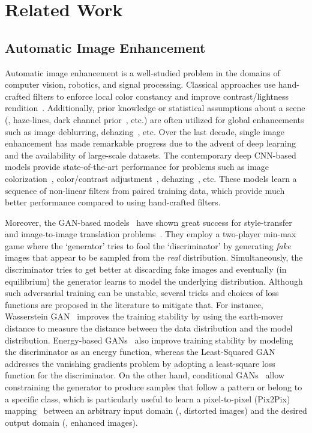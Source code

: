 \documentclass[10pt,twocolumn,letterpaper]{article}
\begin{document}
 \section{Related Work}


\subsection{Automatic Image Enhancement}
Automatic image enhancement is a well-studied problem in the domains of computer vision, robotics, and signal processing. Classical approaches use hand-crafted filters to enforce local color constancy and improve contrast/lightness rendition~\cite{rahman2004retinex}. Additionally, prior knowledge or statistical assumptions about a scene (\eg, haze-lines, dark channel prior~\cite{berman2018underwater}, etc.) are often utilized for global enhancements such as image deblurring,  dehazing~\cite{he2010single}, etc. Over the last decade, single image enhancement has made remarkable progress due to the advent of deep learning and the availability of large-scale datasets. The contemporary deep CNN-based models provide state-of-the-art performance for problems such as image colorization~\cite{zhang2016colorful}, color/contrast adjustment~\cite{cheng2015deep}, dehazing~\cite{cai2016dehazenet}, etc. These models learn a sequence of non-linear filters from paired training data, which provide much better performance compared to using hand-crafted filters. 


Moreover, the GAN-based models~\cite{goodfellow2014generative} have shown great success for style-transfer and image-to-image translation problems~\cite{isola2017image}. They employ a two-player min-max game where the `generator' tries to fool the `discriminator' by generating \textit{fake} images that appear to be sampled from the \textit{real} distribution. Simultaneously, the discriminator tries to get better at discarding fake images and eventually (in equilibrium) the generator learns to model the underlying distribution. Although such adversarial training can be unstable, several tricks and choices of loss functions are proposed in the literature to mitigate that. For instance, Wasserstein GAN~\cite{arjovsky2017wasserstein} improves the training stability by using the earth-mover distance to measure the distance between the data distribution and the model distribution. Energy-based GANs~\cite{zhao2016energy} also improve training stability by modeling the discriminator as an energy function, whereas the Least-Squared GAN~\cite{mao2017least} addresses the vanishing gradients problem by adopting a least-square loss function for the discriminator. On the other hand, conditional GANs~\cite{mirza2014conditional} allow constraining the generator to produce samples that follow a pattern or belong to a specific class, which is particularly useful to learn a pixel-to-pixel (Pix2Pix) mapping~\cite{isola2017image} between an arbitrary input domain (\eg, distorted images) and the desired output domain (\eg, enhanced images).         
\end{document}

